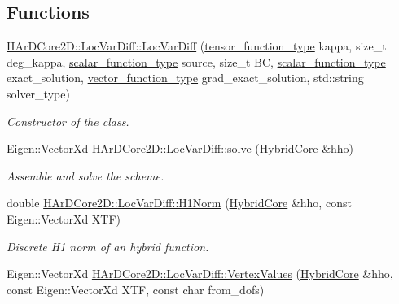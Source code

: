 \subsection*{Functions}
\begin{DoxyCompactItemize}
\item 
\hyperlink{group__HHO__locvar_ga3e1466c2595b771c1afd4f73ec5f27bc}{H\+Ar\+D\+Core2\+D\+::\+Loc\+Var\+Diff\+::\+Loc\+Var\+Diff} (\hyperlink{classHArDCore2D_1_1LocVarDiff_a68ac1fa2f65fa77a2f21c8ff28f8c36f}{tensor\+\_\+function\+\_\+type} kappa, size\+\_\+t deg\+\_\+kappa, \hyperlink{classHArDCore2D_1_1LocVarDiff_a1bb6dadd227f308545e68ec2b18d457c}{scalar\+\_\+function\+\_\+type} source, size\+\_\+t BC, \hyperlink{classHArDCore2D_1_1LocVarDiff_a1bb6dadd227f308545e68ec2b18d457c}{scalar\+\_\+function\+\_\+type} exact\+\_\+solution, \hyperlink{classHArDCore2D_1_1LocVarDiff_a44128fac430109885d14ac8582a68809}{vector\+\_\+function\+\_\+type} grad\+\_\+exact\+\_\+solution, std\+::string solver\+\_\+type)
\begin{DoxyCompactList}\small\item\em Constructor of the class. \end{DoxyCompactList}\item 
\mbox{\label{group__HHO__locvar_ga80c75c7c386169ef8b96763a36dd2a92}} 
Eigen\+::\+Vector\+Xd \hyperlink{group__HHO__locvar_ga80c75c7c386169ef8b96763a36dd2a92}{H\+Ar\+D\+Core2\+D\+::\+Loc\+Var\+Diff\+::solve} (\hyperlink{classHArDCore2D_1_1HybridCore}{Hybrid\+Core} \&hho)
\begin{DoxyCompactList}\small\item\em Assemble and solve the scheme. \end{DoxyCompactList}\item 
\mbox{\label{group__HHO__locvar_ga42adf784c096036d90422baa41fc17c2}} 
double \hyperlink{group__HHO__locvar_ga42adf784c096036d90422baa41fc17c2}{H\+Ar\+D\+Core2\+D\+::\+Loc\+Var\+Diff\+::\+H1\+Norm} (\hyperlink{classHArDCore2D_1_1HybridCore}{Hybrid\+Core} \&hho, const Eigen\+::\+Vector\+Xd X\+TF)
\begin{DoxyCompactList}\small\item\em Discrete H1 norm of an hybrid function. \end{DoxyCompactList}\item 
Eigen\+::\+Vector\+Xd \hyperlink{group__HHO__locvar_ga60a0da4f13e1da374bc3d686004ab439}{H\+Ar\+D\+Core2\+D\+::\+Loc\+Var\+Diff\+::\+Vertex\+Values} (\hyperlink{classHArDCore2D_1_1HybridCore}{Hybrid\+Core} \&hho, const Eigen\+::\+Vector\+Xd X\+TF, const char from\+\_\+dofs)

\end{DoxyCompactItemize}

